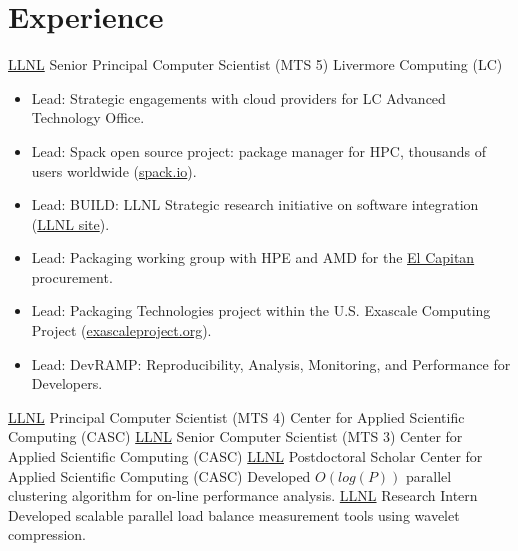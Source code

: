 \section{Experience}
		{\href{http://www.llnl.gov}{LLNL}}
		{Senior Principal Computer Scientist (MTS 5)}
		{}{Livermore Computing (LC)}
		{
                  \begin{itemize}
                  \item Lead: Strategic engagements with cloud providers for LC Advanced Technology Office.
                  \item Lead: Spack open source project: package manager for HPC, thousands of users worldwide (\href{https://spack.io}{spack.io}).
                  \item Lead: BUILD: LLNL Strategic research initiative on software integration (\href{https://computing.llnl.gov/projects/build}{LLNL site}).
                  \item Lead: Packaging working group with HPE and AMD for the \href{https://www.llnl.gov/news/llnl-and-hpe-partner-amd-el-capitan-projected-worlds-fastest-supercomputer}{El Capitan} procurement.
                  \item Lead: Packaging Technologies project within the U.S. Exascale Computing Project (\href{https://exascaleproject.org}{exascaleproject.org}).
                  \item Lead: DevRAMP: Reproducibility, Analysis, Monitoring, and Performance for Developers.
                \end{itemize}
                }
		{\href{http://www.llnl.gov}{LLNL}}
		{Principal Computer Scientist (MTS 4)}
		{Center for Applied Scientific Computing (CASC)}
                {}{}
		{\href{http://www.llnl.gov}{LLNL}}
		{Senior Computer Scientist (MTS 3)}
		{Center for Applied Scientific Computing (CASC)}
                {}{}
		{\href{http://www.llnl.gov}{LLNL}}
		{Postdoctoral Scholar}
		{Center for Applied Scientific Computing (CASC)}{}
		{Developed $O(log(P))$ parallel clustering algorithm for on-line performance analysis.
		 }
		{\href{http://www.llnl.gov}{LLNL}}
		{Research Intern}
		{}{}
		{Developed scalable parallel load balance measurement tools using wavelet compression.}

